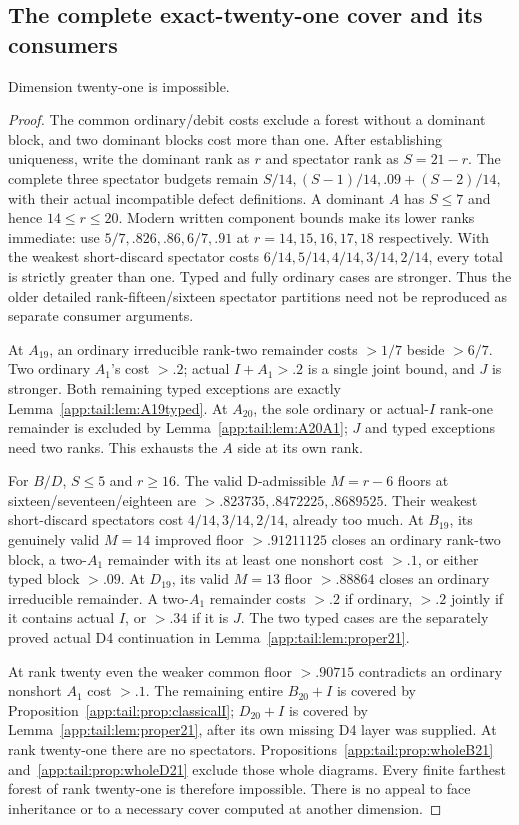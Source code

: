\subsection{The complete exact-twenty-one cover and its consumers}
\label{app:tail:exact21}
\begin{proposition}
\label{app:tail:prop:exact21}
Dimension twenty-one is impossible.
\end{proposition}
\begin{proof}
The common ordinary/debit costs exclude a forest without a dominant
block, and two dominant blocks cost more than one. After establishing
uniqueness, write the dominant rank as $r$ and spectator rank as
$S=21-r$. The complete three spectator budgets remain
$S/14,(S-1)/14,.09+(S-2)/14$, with their actual incompatible
defect definitions. A dominant $A$ has $S\le7$ and hence
$14\le r\le20$. Modern written component bounds make its lower
ranks immediate: use $5/7,.826,.86,6/7,.91$ at
$r=14,15,16,17,18$ respectively. With the weakest short-discard
spectator costs $6/14,5/14,4/14,3/14,2/14$, every total is
strictly greater than one. Typed and fully ordinary cases are
stronger. Thus the older detailed rank-fifteen/sixteen spectator
partitions need not be reproduced as separate consumer arguments.

At $A_{19}$, an ordinary irreducible rank-two remainder costs
$>1/7$ beside $>6/7$. Two ordinary $A_1$'s cost $>.2$;
actual $I+A_1>.2$ is a single joint bound, and $J$ is stronger.
Both remaining typed exceptions are exactly
Lemma~\ref{app:tail:lem:A19typed}. At $A_{20}$, the sole
ordinary or actual-$I$ rank-one remainder is excluded by
Lemma~\ref{app:tail:lem:A20A1}; $J$ and typed exceptions need
two ranks. This exhausts the $A$ side at its own rank.

For $B/D$, $S\le5$ and $r\ge16$. The valid D-admissible
$M=r-6$ floors at sixteen/seventeen/eighteen are
$>.823735,.8472225,.8689525$. Their weakest short-discard
spectators cost $4/14,3/14,2/14$, already too much.
At $B_{19}$, its genuinely valid $M=14$ improved floor
$>.91211125$ closes an ordinary rank-two block, a two-$A_1$
remainder with its at least one nonshort cost $>.1$, or either
typed block $>.09$. At $D_{19}$, its valid $M=13$ floor
$>.88864$ closes an ordinary irreducible remainder. A two-$A_1$
remainder costs $>.2$ if ordinary, $>.2$ jointly if it contains
actual $I$, or $>.34$ if it is $J$. The two typed cases are
the separately proved actual D4 continuation in
Lemma~\ref{app:tail:lem:proper21}.

At rank twenty even the weaker common floor $>.90715$ contradicts
an ordinary nonshort $A_1$ cost $>.1$. The remaining entire
$B_{20}+I$ is covered by Proposition~\ref{app:tail:prop:classicalI};
$D_{20}+I$ is covered by Lemma~\ref{app:tail:lem:proper21},
after its own missing D4 layer was supplied. At rank twenty-one
there are no spectators. Propositions~\ref{app:tail:prop:wholeB21}
and~\ref{app:tail:prop:wholeD21} exclude those whole diagrams.
Every finite farthest forest of rank twenty-one is therefore
impossible. There is no appeal to face inheritance or to a
necessary cover computed at another dimension.
\end{proof}

